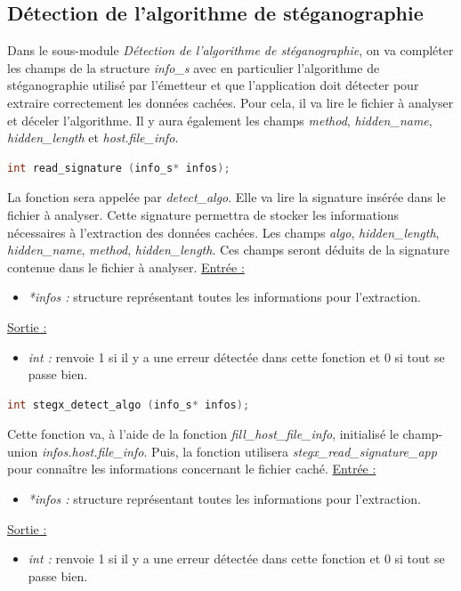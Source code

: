 \documentclass[11pt]{article}
\begin{document}
\subsection{Détection de l'algorithme de stéganographie}

Dans le sous-module \textit{Détection de l'algorithme de stéganographie}, 
on va compléter les champs de la structure \textit{info\_s} avec en particulier 
l'algorithme de stéganographie utilisé par l'émetteur et que l'application 
doit détecter pour extraire correctement les données cachées. Pour cela, 
il va lire le fichier à analyser et déceler l'algorithme. Il y aura également 
les champs \textit{method}, \textit{hidden\_name}, \textit{hidden\_length}
et \textit{host.file\_info}.\newline

\begin{lstlisting}[language=c]
int read_signature (info_s* infos); 
\end{lstlisting}

La fonction sera appelée par \textit{detect\_algo}.
Elle va lire la signature insérée dans le fichier à analyser. 
Cette signature permettra de stocker les informations nécessaires à 
l'extraction des données cachées. 
Les champs \textit{algo}, \textit{hidden\_length}, 
\textit{hidden\_name}, \textit{method}, \textit{hidden\_length}. Ces champs 
seront déduits de la signature contenue dans le fichier à analyser. 
\newline
\underline{Entrée :} 
\begin{itemize}
\item \textit{*infos :} structure représentant toutes les informations pour 
l'extraction.  
\end{itemize}
\underline{Sortie :} 
\begin{itemize}
\item \textit{int :} renvoie 1 si il y a une erreur détectée dans cette 
fonction et 0 si tout se passe bien.  
\newline 
\end{itemize}

\begin{lstlisting}[language=c]
int stegx_detect_algo (info_s* infos); 
\end{lstlisting}

Cette fonction va, à l'aide de la fonction \textit{fill\_host\_file\_info}, 
initialisé le champ-union \textit{infos.host.file\_info}. Puis, la 
fonction utilisera \textit{stegx\_read\_signature\_app} pour connaître les 
informations concernant le fichier caché. 
\newline
\underline{Entrée :} 
\begin{itemize}
\item \textit{*infos :} structure représentant toutes les informations pour 
l'extraction. 
\end{itemize}
\underline{Sortie :} 
\begin{itemize}
\item \textit{int :} renvoie 1 si il y a une erreur détectée dans cette 
fonction et 0 si tout se passe bien.  
\newline 
\end{itemize}
\end{document}
